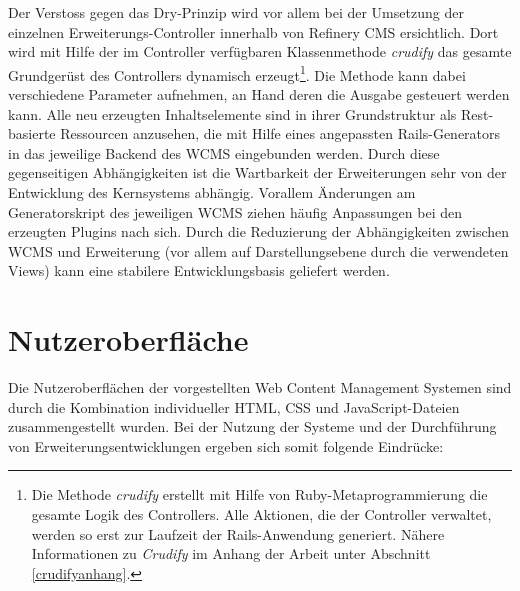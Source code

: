 Der Verstoss gegen das Dry-Prinzip wird vor allem bei der Umsetzung der einzelnen Erweiterungs-Controller innerhalb von Refinery CMS ersichtlich. Dort wird mit Hilfe der im Controller verfügbaren Klassenmethode \emph{crudify} das gesamte Grundgerüst des Controllers dynamisch erzeugt\footnote{Die Methode \emph{crudify} erstellt mit Hilfe von Ruby-Metaprogrammierung die gesamte Logik des Controllers. Alle Aktionen, die der Controller verwaltet, werden so erst zur Laufzeit der Rails-Anwendung generiert. Nähere Informationen zu \emph{Crudify} im Anhang der Arbeit unter Abschnitt \ref{crudifyanhang}.}. Die Methode kann dabei verschiedene Parameter aufnehmen, an Hand deren die Ausgabe gesteuert werden kann. Alle neu erzeugten Inhaltselemente sind in ihrer Grundstruktur als Rest-basierte Ressourcen anzusehen, die mit Hilfe eines angepassten Rails-Generators in das jeweilige Backend des WCMS eingebunden werden. Durch diese gegenseitigen Abhängigkeiten ist die Wartbarkeit der Erweiterungen sehr von der Entwicklung des Kernsystems abhängig. Vorallem Änderungen am Generatorskript des jeweiligen WCMS ziehen häufig Anpassungen bei den erzeugten Plugins nach sich. Durch die Reduzierung der Abhängigkeiten zwischen WCMS und Erweiterung (vor allem auf Darstellungsebene durch die verwendeten Views) kann eine stabilere Entwicklungsbasis geliefert werden.




\section{Nutzeroberfläche}

Die Nutzeroberflächen der vorgestellten Web Content Management Systemen sind durch die Kombination individueller HTML, CSS und JavaScript-Dateien zusammengestellt wurden. Bei der Nutzung der Systeme und der Durchführung von Erweiterungsentwicklungen ergeben sich somit folgende Eindrücke:

